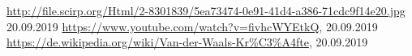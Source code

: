 \begin{thebibliography}{xxx}
        \url{http://file.scirp.org/Html/2-8301839/5ea73474-0e91-41d4-a386-71cdc9f14e20.jpg}
        20.09.2019
        \url{https://www.youtube.com/watch?v=fivhcWYEtkQ},
		20.09.2019
        \url{https://de.wikipedia.org/wiki/Van-der-Waals-Kr%C3%A4fte},
		20.09.2019
\end{thebibliography}
 
